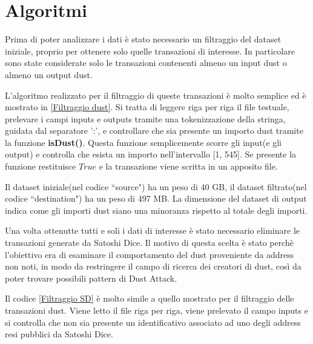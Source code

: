 \section{Algoritmi}\label{algoritmii}
Prima di poter analizzare i dati è stato necessario un filtraggio del dataset iniziale, proprio per ottenere solo quelle transazioni di interesse. In particolare sono state considerate solo le transazioni contenenti almeno un input dust o almeno un output dust. 

L'algoritmo realizzato per il filtraggio di queste transazioni è molto semplice ed è mostrato in \ref{Filtraggio dust}. Si tratta di leggere riga per riga il file testuale, prelevare i campi inputs e outputs tramite una tokenizzazione della stringa, guidata dal separatore ':', e controllare che sia presente un importo dust tramite la funzione \textbf{isDust()}. Questa funzione semplicemente scorre gli input(e gli output) e controlla che esista un importo nell'intervallo [1, 545]. Se presente la funzione restituisce $True$ e la transazione viene scritta in un apposito file.

Il dataset iniziale(nel codice ``source") ha un peso di 40 GB, il dataset filtrato(nel codice ``destination") ha un peso di 497 MB. La dimensione del dataset di output indica come gli importi dust siano una minoranza rispetto al totale degli importi.

Una volta ottenutte tutti e soli i dati di interesse è stato necessario eliminare le transazioni generate da Satoshi Dice. Il motivo di questa scelta è stato perchè l'obiettivo era di esaminare il comportamento del dust proveniente da address non noti, in modo da restringere il campo di ricerca dei creatori di dust, così da poter trovare possibili pattern di Dust Attack.

Il codice \ref{Filtraggio SD} è molto simile a quello mostrato per il filtraggio delle transazioni dust. Viene letto il file riga per riga, viene prelevato il campo inputs e si controlla che non sia presente un identificativo associato ad uno degli address resi pubblici da Satoshi Dice. 

